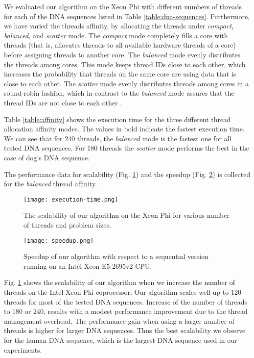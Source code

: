 \documentclass[conference]{IEEEtran}
\begin{document}
We evaluated our algorithm on the Xeon Phi with different numbers of threads for each of the DNA sequences listed in Table \ref{table:dna-sequences}. Furthermore, we have varied the threads affinity, by allocating the threads under \emph{compact, balanced,} and \emph{scatter} mode. The \emph{compact} mode completely fills a core with threads (that is, allocates threads to all available hardware threads of a core) before assigning threads to another core. The \emph{balanced} mode evenly distributes the threads among cores. This mode keeps thread IDs close to each other, which increases the probability that threads on the same core are using data that is close to each other. The \emph{scatter} mode evenly distributes threads among cores in a round-robin fashion, which in contrast to the \emph{balanced} mode assures that the thread IDs are not close to each other \cite{barth2013best}. 

Table \ref{table:affinity} shows the execution time for the three different thread allocation affinity modes. The values in bold indicate the fastest execution time. We can see that for 240 threads, the \emph{balanced} mode is the fastest one for all tested DNA sequences. For 180 threads the \emph{scatter} mode performs the best in the case of dog's DNA sequence. 



The performance data for scalability (Fig. \ref{fig:execution}) and the speedup (Fig. \ref{fig:speedup}) is collected for the \emph{balanced} thread affinity. 

\begin{figure}
	\centering
	\texttt{[image: execution-time.png]}
	\caption{The scalability of our algorithm on the Xeon Phi for various number of threads and problem sizes.}
	\label{fig:execution}

\end{figure}

\begin{figure}
	\centering
	\texttt{[image: speedup.png]}
	\caption{Speedup of our algorithm with respect to a sequential version running on an Intel Xeon E5-2695v2 CPU.}
	\label{fig:speedup}
\end{figure}


Fig. \ref{fig:execution} shows the scalability of our algorithm when we increase the number of threads on the Intel Xeon Phi coprocessor. Our algorithm scales well up to 120 threads for most of the tested DNA sequences. Increase of the number of threads to 180 or 240, results with a modest performance improvement due to the thread management overhead. The performance gain when using a larger number of threads is higher for larger DNA sequences. Thus the best scalability we observe for the human DNA sequence, which is the largest DNA sequence used in our experiments. 
\end{document}
